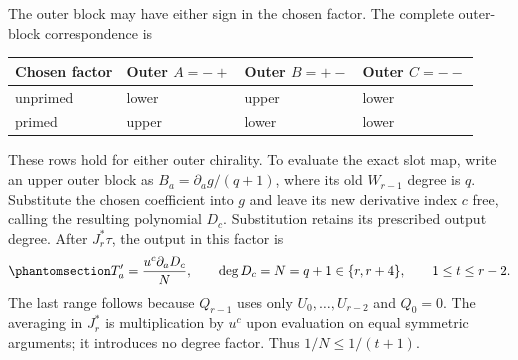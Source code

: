 \documentclass[
  english,
  11pt,
  reqno]{amsart}
\newcounter{none} %
\begin{document}
The outer block may have either sign in the chosen factor. The complete
outer-block correspondence is

{\def\LTcaptype{none} %
\begin{longtable}[]{@{}llll@{}}
\toprule\noalign{}
Chosen factor & Outer \(A=-+\) & Outer \(B=+-\) & Outer \(C=--\) \\
\midrule\noalign{}
\endhead
\bottomrule\noalign{}
\endlastfoot
unprimed & lower & upper & lower \\
primed & upper & lower & lower \\
\end{longtable}
}

These rows hold for either outer chirality. To evaluate the exact slot
map, write an upper outer block as \(B_a=\partial_ag/(q+1)\), where its
old \(W_{r-1}\) degree is \(q\). Substitute the chosen coefficient into
\(g\) and leave its new derivative index \(c\) free, calling the
resulting polynomial \(D_c\). Substitution retains its prescribed output
degree. After \(J_r^*\tau\), the output in this factor is
\begin{equation}\protect\phantomsection\label{eq:gg-budget-exact-slot-degree}{
 T'_a=\frac{u^c\partial_aD_c}{N},\qquad
 \deg D_c=N=q+1\in\{r,r+4\},\qquad
 1\le t\le r-2.
}\end{equation} The last range follows because \(Q_{r-1}\) uses only
\(U_0,\ldots,U_{r-2}\) and \(Q_0=0\). The averaging in \(J_r^*\) is
multiplication by \(u^c\) upon evaluation on equal symmetric arguments;
it introduces no degree factor. Thus \(1/N\le1/(t+1)\).
\end{document}
